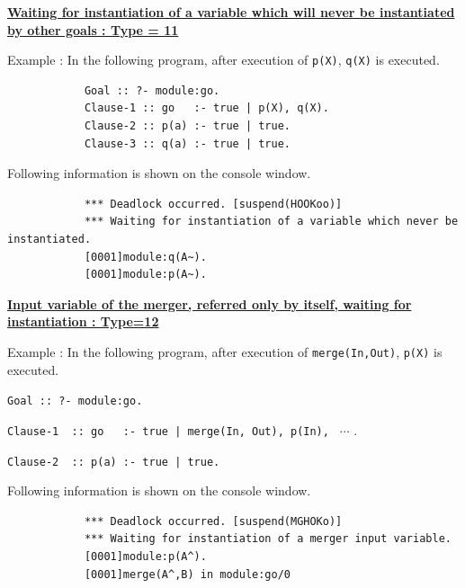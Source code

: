 \noindent\underline{\bf
Waiting for instantiation of a variable which will never be instantiated by
other goals : Type = 11}
\vspace{1ex}\par
Example : In the following program, after execution of \verb|p(X)|, \verb|q(X)| is executed.
\begin{verbatim}
            Goal :: ?- module:go.
            Clause-1 :: go   :- true | p(X), q(X).
            Clause-2 :: p(a) :- true | true.
            Clause-3 :: q(a) :- true | true.
\end{verbatim}\par
Following information is shown on the console window.
\begin{verbatim}
            *** Deadlock occurred. [suspend(HOOKoo)]
            *** Waiting for instantiation of a variable which never be instantiated.
            [0001]module:q(A~).
            [0001]module:p(A~).
\end{verbatim}
\vspace{1ex}

\noindent\underline{\bf
Input variable of the merger, referred only by itself, waiting for instantiation : Type=12}
\vspace{1ex}\par
Example : In the following program, after execution of \verb|merge(In,Out)|,
\verb|p(X)| is executed.\vspace{1ex}

\hspace{11ex} \verb|Goal :: ?- module:go.|

\hspace{11ex}
\verb!Clause-1  :: go   :- true | merge(In, Out), p(In), ! $\cdots$ .

\hspace{11ex}
\verb!Clause-2  :: p(a) :- true | true.!
\par
Following information is shown on the console window.
\begin{verbatim}
            *** Deadlock occurred. [suspend(MGHOKo)]
            *** Waiting for instantiation of a merger input variable.
            [0001]module:p(A^).
            [0001]merge(A^,B) in module:go/0
\end{verbatim}
\vspace{1ex}

